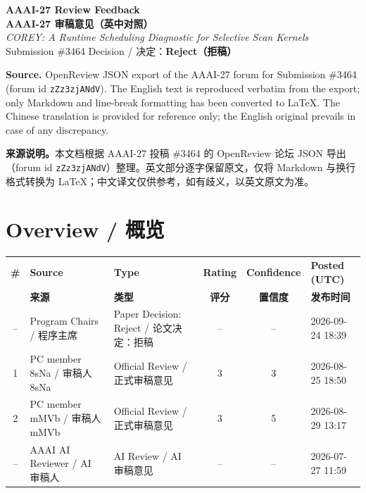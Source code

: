 \documentclass[10pt,a4paper]{article}
\begin{document}
\begin{center}
  {\LARGE\bfseries\color{accent} AAAI-27 Review Feedback}\\[0.35em]
  {\Large\bfseries\color{accent} AAAI-27 审稿意见（英中对照）}\\[0.8em]
  {\large\itshape COREY: A Runtime Scheduling Diagnostic for Selective Scan Kernels}\\[0.5em]
  {\normalsize Submission \#3464 \quad\textbar\quad
   Decision / 决定：{\color{rejectred}\bfseries Reject（拒稿）}}
\end{center}

\begin{infobox}
\textbf{Source.} OpenReview JSON export of the AAAI-27 forum for Submission \#3464
(forum id \texttt{zZz3zjANdV}). The English text is reproduced verbatim from the
export; only Markdown and line-break formatting has been converted to LaTeX. The
Chinese translation is provided for reference only; the English original prevails
in case of any discrepancy.\par
\textbf{来源说明。}本文档根据 AAAI-27 投稿 \#3464 的 OpenReview 论坛 JSON 导出
（forum id \texttt{zZz3zjANdV}）整理。英文部分逐字保留原文，仅将 Markdown 与换行格式转换为
LaTeX；中文译文仅供参考，如有歧义，以英文原文为准。
\end{infobox}

\section*{Overview / 概览}

\begin{center}
\small
{}
\begin{tabularx}{\textwidth}{@{}c L L c c l@{}}
\toprule
\textbf{\#} & \textbf{Source} & \textbf{Type} & \textbf{Rating} & \textbf{Confidence} & \textbf{Posted (UTC)} \\
            & \textbf{来源}   & \textbf{类型} & \textbf{评分}   & \textbf{置信度}     & \textbf{发布时间} \\
\midrule
-- & Program Chairs / 程序主席 & Paper Decision: Reject / 论文决定：拒稿 & -- & -- & 2026-09-24 18:39 \\
1  & PC member 8sNa / 审稿人 8sNa & Official Review / 正式审稿意见 & 3 & 3 & 2026-08-25 18:50 \\
2  & PC member mMVb / 审稿人 mMVb & Official Review / 正式审稿意见 & 3 & 5 & 2026-08-29 13:17 \\
-- & AAAI AI Reviewer / AI 审稿人 & AI Review / AI 审稿意见 & -- & -- & 2026-07-27 11:59 \\
\bottomrule
\end{tabularx}
\end{center}
\end{document}
